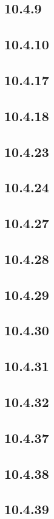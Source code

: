 \documentclass[12pt]{article}
\begin{document}
\subsection*{10.4.9}
\subsection*{10.4.10}
\subsection*{10.4.17}
\subsection*{10.4.18}
\subsection*{10.4.23}
\subsection*{10.4.24}
\subsection*{10.4.27}
\subsection*{10.4.28}
\subsection*{10.4.29}
\subsection*{10.4.30}
\subsection*{10.4.31}
\subsection*{10.4.32}
\subsection*{10.4.37}
\subsection*{10.4.38}
\subsection*{10.4.39}
\end{document}
